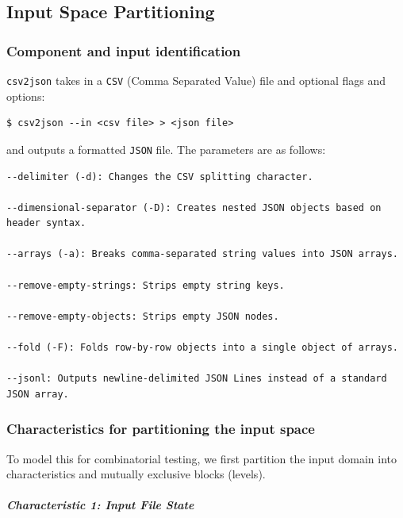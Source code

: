 \documentclass[
]{article}
\begin{document}
\subsection{Input Space Partitioning}\label{input-space-partitioning}

\subsubsection{Component and input
identification}\label{component-and-input-identification}

\texttt{csv2json} takes in a \texttt{CSV} (Comma Separated Value) file
and optional flags and options:

\begin{verbatim}
$ csv2json --in <csv file> > <json file>
\end{verbatim}

and outputs a formatted \texttt{JSON} file. The parameters are as
follows:

\begin{verbatim}
--delimiter (-d): Changes the CSV splitting character.

--dimensional-separator (-D): Creates nested JSON objects based on header syntax.

--arrays (-a): Breaks comma-separated string values into JSON arrays.

--remove-empty-strings: Strips empty string keys.

--remove-empty-objects: Strips empty JSON nodes.

--fold (-F): Folds row-by-row objects into a single object of arrays.

--jsonl: Outputs newline-delimited JSON Lines instead of a standard JSON array.
\end{verbatim}

\subsubsection{Characteristics for partitioning the input
space}\label{characteristics-for-partitioning-the-input-space}

To model this for combinatorial testing, we first partition the input
domain into characteristics and mutually exclusive blocks (levels).

\paragraph{\texorpdfstring{\emph{Characteristic 1: Input File
State}}{Characteristic 1: Input File State}}\label{characteristic-1-input-file-state}
\end{document}
